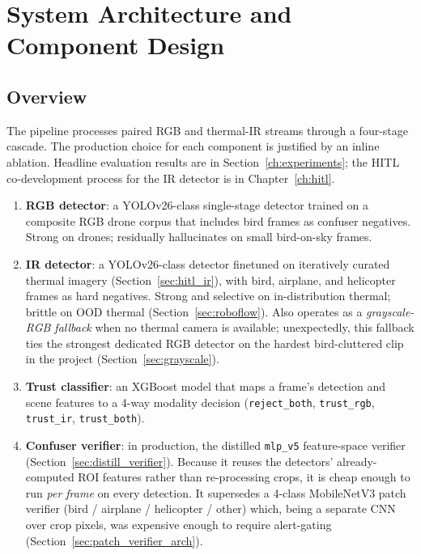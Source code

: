 \section{System Architecture and Component Design}
\label{ch:architecture}

\subsection{Overview}

The pipeline processes paired RGB and thermal-IR streams through a four-stage cascade. The production choice for each component is justified by an inline ablation. Headline evaluation results are in Section~\ref{ch:experiments}; the HITL co-development process for the IR detector is in Chapter~\ref{ch:hitl}.

\begin{enumerate}
    \item \textbf{RGB detector}: a YOLOv26-class single-stage detector trained on a composite RGB drone corpus that includes bird frames as confuser negatives. Strong on drones; residually hallucinates on small bird-on-sky frames.
    \item \textbf{IR detector}: a YOLOv26-class detector finetuned on iteratively curated thermal imagery (Section~\ref{sec:hitl_ir}), with bird, airplane, and helicopter frames as hard negatives. Strong and selective on in-distribution thermal; brittle on OOD thermal (Section~\ref{sec:roboflow}). Also operates as a \emph{grayscale-RGB fallback} when no thermal camera is available; unexpectedly, this fallback ties the strongest dedicated RGB detector on the hardest bird-cluttered clip in the project (Section~\ref{sec:grayscale}).
    \item \textbf{Trust classifier}: an XGBoost model that maps a frame's detection and scene features to a 4-way modality decision (\texttt{reject\_both}, \texttt{trust\_rgb}, \texttt{trust\_ir}, \texttt{trust\_both}).
    \item \textbf{Confuser verifier}: in production, the distilled \texttt{mlp\_v5} feature-space verifier (Section~\ref{sec:distill_verifier}). Because it reuses the detectors' already-computed ROI features rather than re-processing crops, it is cheap enough to run \emph{per frame} on every detection. It supersedes a 4-class MobileNetV3 patch verifier (bird / airplane / helicopter / other) which, being a separate CNN over crop pixels, was expensive enough to require alert-gating (Section~\ref{sec:patch_verifier_arch}).
\end{enumerate}

